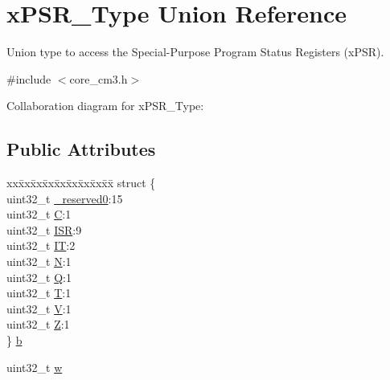 \hypertarget{unionxPSR__Type}{}\section{x\+P\+S\+R\+\_\+\+Type Union Reference}
\label{unionxPSR__Type}


Union type to access the Special-\/\+Purpose Program Status Registers (x\+P\+SR).  




{\ttfamily \#include $<$core\+\_\+cm3.\+h$>$}



Collaboration diagram for x\+P\+S\+R\+\_\+\+Type\+:
\subsection*{Public Attributes}
\begin{DoxyCompactItemize}
\item 
\begin{tabbing}
xx\=xx\=xx\=xx\=xx\=xx\=xx\=xx\=xx\=\kill
struct \{\\
\>uint32\_t \hyperlink{unionxPSR__Type_af438e0f407357e914a70b5bd4d6a97c5}{\_reserved0}:15\\
\>uint32\_t \hyperlink{unionxPSR__Type_a40213a6b5620410cac83b0d89564609d}{C}:1\\
\>uint32\_t \hyperlink{unionxPSR__Type_a3e9120dcf1a829fc8d2302b4d0673970}{ISR}:9\\
\>uint32\_t \hyperlink{unionxPSR__Type_a3200966922a194d84425e2807a7f1328}{IT}:2\\
\>uint32\_t \hyperlink{unionxPSR__Type_a2db9a52f6d42809627d1a7a607c5dbc5}{N}:1\\
\>uint32\_t \hyperlink{unionxPSR__Type_add7cbd2b0abd8954d62cd7831796ac7c}{Q}:1\\
\>uint32\_t \hyperlink{unionxPSR__Type_a7eed9fe24ae8d354cd76ae1c1110a658}{T}:1\\
\>uint32\_t \hyperlink{unionxPSR__Type_af14df16ea0690070c45b95f2116b7a0a}{V}:1\\
\>uint32\_t \hyperlink{unionxPSR__Type_a1e5d9801013d5146f2e02d9b7b3da562}{Z}:1\\
\} \hyperlink{unionxPSR__Type_a3b1063bb5cdad67e037cba993b693b70}{b}\\

\end{tabbing}\item 
uint32\+\_\+t \hyperlink{unionxPSR__Type_a1a47176768f45f79076c4f5b1b534bc2}{w}
\end{DoxyCompactItemize}


